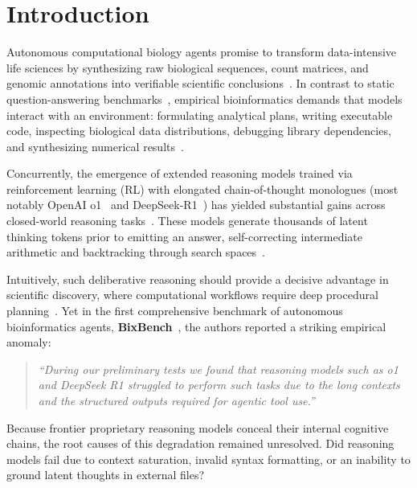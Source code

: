 \documentclass[11pt,letterpaper]{article}
\begin{document}
\vspace{0.8em}

\section{Introduction}

Autonomous computational biology agents promise to transform data-intensive life sciences by synthesizing raw biological sequences, count matrices, and genomic annotations into verifiable scientific conclusions~\cite{mitchener2025bixbench,gao2024empowering}. In contrast to static question-answering benchmarks~\cite{sarwal2023biollm,yin2024evaluation,laurent2024labbench}, empirical bioinformatics demands that models interact with an environment: formulating analytical plans, writing executable code, inspecting biological data distributions, debugging library dependencies, and synthesizing numerical results~\cite{tang2024biocoder,deshpande2024evolution}.

Concurrently, the emergence of extended reasoning models trained via reinforcement learning (RL) with elongated chain-of-thought monologues (most notably OpenAI o1~\cite{openai2024o1} and DeepSeek-R1~\cite{guo2025deepseek}) has yielded substantial gains across closed-world reasoning tasks~\cite{chan2024mlebench,bogin2024super,siegel2024corebench}. These models generate thousands of latent thinking tokens prior to emitting an answer, self-correcting intermediate arithmetic and backtracking through search spaces~\cite{lambert2025tulu3}.

Intuitively, such deliberative reasoning should provide a decisive advantage in scientific discovery, where computational workflows require deep procedural planning~\cite{lu2024aiscientist,schmidgall2025agentlab,swanson2024virtuallab,skarlinski2024superhuman}. Yet in the first comprehensive benchmark of autonomous bioinformatics agents, \textbf{BixBench}~\cite{mitchener2025bixbench}, the authors reported a striking empirical anomaly:
\begin{quote}
\textit{``During our preliminary tests we found that reasoning models such as o1 and DeepSeek R1 struggled to perform such tasks due to the long contexts and the structured outputs required for agentic tool use.''}~\cite{mitchener2025bixbench}
\end{quote}

Because frontier proprietary reasoning models conceal their internal cognitive chains, the root causes of this degradation remained unresolved. Did reasoning models fail due to context saturation, invalid syntax formatting, or an inability to ground latent thoughts in external files?
\end{document}
